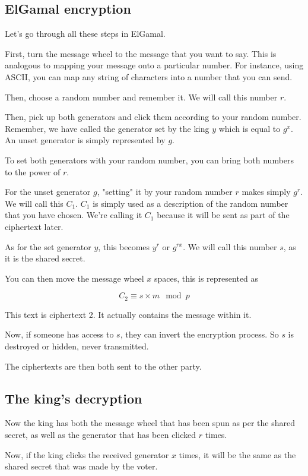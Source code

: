 \documentclass{article}
\begin{document}
  \subsection*{ElGamal encryption}

  Let's go through all these steps in ElGamal.

  First, turn the message wheel to the message that you want to say. This is
  analogous to mapping your message onto a particular number. For instance,
  using ASCII, you can map any string of characters into a number that you can
  send.

  Then, choose a random number and remember it. We will call this number $r$.

  Then, pick up both generators and click them according to your random number.
  Remember, we have called the generator set by the king $y$ which is equal to
  $g^x$. An unset generator is simply represented by $g$.

  To set both generators with your random number, you can bring both numbers to
  the power of $r$.

  For the unset generator $g$, "setting" it by your random number $r$ makes
  simply $g^r$. We will call this $C_1$. $C_1$ is simply used as a description
  of the random number that you have chosen. We're calling it $C_1$ because
  it will be sent as part of the ciphertext later.

  As for the set generator $y$, this becomes $y^r$ or $g^{rx}$. We will call
  this number $s$, as it is the shared secret.

  You can then move the message wheel $x$ spaces, this is represented as

  \[ C_2 \equiv s \times m \mod p \]

  This text is ciphertext 2. It actually contains the message within it.

  Now, if someone has access to $s$, they can invert the encryption process. So
  $s$ is destroyed or hidden, never transmitted.

  The ciphertexts are then both sent to the other party.

  \subsection*{The king's decryption}
  Now the king has both the message wheel that has been spun as per the
  shared secret, as well as the generator that has been clicked $r$ times.

  Now, if the king clicks the received generator $x$ times, it will be
  the same as the shared secret that was made by the voter.
\end{document}
